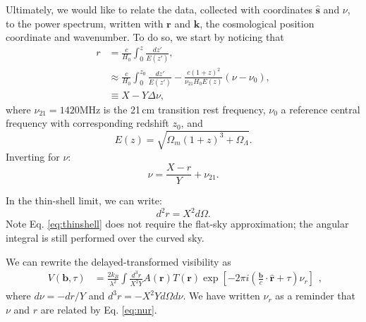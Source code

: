 \documentclass[twocolumn,apj,numberedappendix]{emulateapj}
\renewcommand\[{\begin{equation}}
\renewcommand\]{\end{equation}}
\begin{document}
Ultimately,
we would like to relate the data, collected with coordinates $\hat{\boldsymbol{s}}$
and $\nu$, to the power spectrum, written with 
$\boldsymbol{r}$ and $\boldsymbol{k}$, the cosmological position coordinate and wavenumber. To do so, we start by noticing that
\[
\begin{aligned}r & =\frac{c}{H_{0}}\int_{0}^{z}\frac{dz'}{E(z')},\\
 & \approx\frac{c}{H_{0}}\int_{0}^{z_{0}}\frac{dz'}{E(z')}-\frac{c(1+z)^{2}}{\nu_{21}H_{0}E(z)}\left(\nu-\nu_{0}\right),\\
 & \equiv X-Y\Delta\nu,
\end{aligned} \label{eq:r}
\]
where $\nu_{21}=1420$MHz is the 21\,cm transition rest frequency, $\nu_{0}$
a reference central frequency with corresponding redshift $z_{0}$,
and 
\[
E(z)=\sqrt{\Omega_{m}(1+z)^{3}+\Omega_{\Lambda}}.
\]
Inverting for $\nu$:
\begin{equation}
\nu=\frac{X-r}{Y}+\nu_{21}.\label{eq:nur}
\end{equation}

In the thin-shell limit, we can write:
\begin{equation}
d^2r=X^2d\Omega. 
\label{eq:thinshell}
\end{equation}
Note Eq. \eqref{eq:thinshell} does not require the flat-sky approximation; the angular integral is still performed over the curved sky. 

We can rewrite the delayed-transformed visibility as 
\small
\[
\begin{aligned}V(\boldsymbol{b},\tau) & =\frac{2k_{B}}{\lambda^{2}}\int\frac{d^{3}r}{X^{2}Y}A(\boldsymbol{r})T(\boldsymbol{r})\exp\left[-2\pi i\left(\frac{\boldsymbol{b}}{c}\cdot\hat{\boldsymbol{r}}+\tau\right)\nu_{r}\right]\end{aligned},
\]
\normalsize
 where $d\nu=-dr/Y$ and $d^{3}r=-X^{2}Yd\Omega d\nu$. 
We have written $\nu_{r}$ as a reminder that $\nu$ and $r$ are related
by Eq. \eqref{eq:nur}. 
\end{document}
